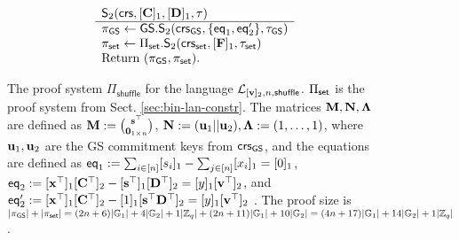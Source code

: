 \begin{figure}
$$\begin{array}{ll}
\begin{array}{l}
{\mathsf{S}_2(\mathsf{crs},[\mathbf{{C}}]_1,[\mathbf{{D}}]_1,\tau)}\\
\hline
\pi_{\mathsf{GS}}\gets {\mathsf{GS}}.\mathsf{S}_2(\mathsf{crs}_{\mathsf{GS}},\{\mathsf{eq}_1,\mathsf{eq}'_2\},\tau_{\mathsf{GS}})\\
\pi_{\mathsf{set}}\gets \Pi_{\mathsf{set}}.\mathsf{S}_2(\mathsf{crs}_{\mathsf{set}},[\mathbf{{F}}]_1,\tau_{\mathsf{set}})\\
\text{Return }  (\pi_{\mathsf{GS}},\pi_{\mathsf{set}}).
\end{array}
\end{array}$$
\caption{The proof system $\Pi_\mathsf{shuffle}$ for the language $\mathcal{L}_{[\mathbf{v}]_2,n,\mathsf{shuffle}}$. $\Pi_{\mathsf{set}}$ is the proof system from Sect. \ref{sec:bin-lan-constr}. The matrices $\mathbf{{M}},\mathbf{{N}},\mathbf{{\Lambda}}$ are defined as
$\mathbf{{M}}:=\binom{\mathbf{s}^\top}{\mathbf{{0}}_{1\times n}}$,
$\mathbf{{N}}:=(\mathbf{u}_1||\mathbf{u}_2),\mathbf{{\Lambda}}:= (1,\ldots,1)$, where $\mathbf{u}_1,\mathbf{u}_2$ are the GS commitment keys from $\mathsf{crs}_{\mathsf{GS}}$, and the equations are defined as $\mathsf{eq}_1:= \sum_{i\in[n]}[s_i]_1-\sum_{j\in[n]}[{x}_i]_1 = [0]_1$, $\mathsf{eq}_2:= [\mathbf{x}^\top]_1[\mathbf{{C}}^\top]_2-[\mathbf{s}^\top]_1[\mathbf{{D}}^\top]_2=[y]_1[\mathbf{v}^\top]_2$, and $\mathsf{eq}'_2:= [\mathbf{x}^\top]_1[\mathbf{{C}}^\top]_2-[1]_1[\mathbf{s}^\top\mathbf{{D}}^\top]_2=[y]_1[\mathbf{v}^\top]_2$   
. The proof size is $|\pi_{\mathsf{GS}}|+|\pi_{\mathsf{set}}|=(2n+6)|\mathbb{G}_1|+4|\mathbb{G}_2|+1|\mathbb{Z}_q|+(2n+11)|\mathbb{G}_1|+10|\mathbb{G}_2|=(4n+17)|\mathbb{G}_1|+14|\mathbb{G}_2|+1|\mathbb{Z}_q|$.
\label{fig:shuffles}}
\end{figure}

